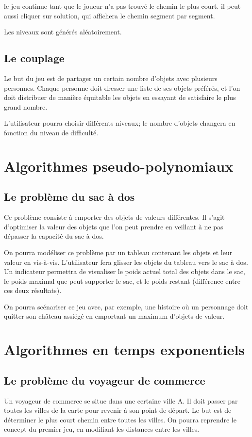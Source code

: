         le jeu continue tant que le joueur n'a pas trouvé le chemin
        le plus court. il peut aussi cliquer sur \og solution\fg, qui
        affichera le chemin segment par segment.

        Les niveaux sont générés aléatoirement.

    \subsection{Le couplage}
        Le but du jeu est de partager un certain nombre d'objets avec plusieurs
        personnes. Chaque personne doit dresser une liste de ses objets préférés,
        et l'on doit distribuer de manière équitable les objets en essayant de
        satisfaire le plus grand nombre.

        L'utilisateur pourra choisir différents niveaux; le nombre d'objets
        changera en fonction du niveau de difficulté.

\section{Algorithmes pseudo-polynomiaux}
    \subsection{Le problème du sac à dos}
        Ce problème consiste à emporter des objets de valeurs différentes. Il s'agit
        d'optimiser la valeur des objets que l'on peut prendre en veillant à ne pas
        dépasser la capacité du sac à dos.

        On pourra modéliser ce problème par un tableau contenant les objets et leur
        valeur en vis-à-vis. L'utilisateur fera glisser les objets du tableau vers
        le sac à dos. Un indicateur permettra de visualiser le poids actuel total
        des objets dans le sac, le poids maximal que peut supporter le sac, et le
        poids restant (différence entre ces deux résultats).

        On pourra scénariser ce jeu avec, par exemple, une histoire où un personnage
        doit quitter son château assiégé en emportant un maximum d'objets de valeur.

\section{Algorithmes en temps exponentiels}
     \subsection{Le problème du voyageur de commerce}
            Un voyageur de commerce se situe dans une certaine ville A. Il doit passer
            par toutes les villes de la carte pour revenir à son point de départ. Le but
            est de déterminer le plus court chemin entre toutes les villes. On pourra
            reprendre le concept du premier jeu, en modifiant les distances entre les
            villes.
